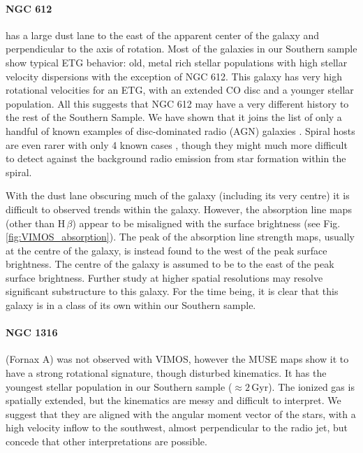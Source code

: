

\paragraph{NGC 612} has a large dust lane to the east of the apparent center of the galaxy and perpendicular to the axis of rotation. Most of the galaxies in our Southern sample show typical ETG behavior: old, metal rich stellar populations with high stellar velocity dispersions with the exception of NGC 612. This galaxy has very high rotational velocities for an ETG, with an extended CO disc and a younger stellar population. All this suggests that NGC 612 may have a very different history to the rest of the Southern Sample. We have shown that it joins the list of only a handful of known examples of disc-dominated radio (AGN) galaxies \citep[e.g.][]{Morganti2011}. Spiral hosts are even rarer with only 4 known cases \citep{Ledlow1998, Hota2011a, Bagchi2014, Mao2015}, though they might much more difficult to detect against the background radio emission from star formation within the spiral.

With the dust lane obscuring much of the galaxy (including its very centre) it is difficult to observed trends within the galaxy. However, the absorption line maps (other than H\,$\beta$) appear to be misaligned with the surface brightness (see Fig.\,\ref{fig:VIMOS_absorption}). The peak of the absorption line strength maps, usually at the centre of the galaxy, is instead found to the west of the peak surface brightness. The centre of the galaxy is assumed to be to the east of the peak surface brightness. Further study at higher spatial resolutions may resolve significant substructure to this galaxy. For the time being, it is clear that this galaxy is in a class of its own within our Southern sample. 


\paragraph{NGC 1316} (Fornax A) was not observed with VIMOS, however the MUSE maps show it to have a strong rotational signature, though disturbed kinematics. It has the youngest stellar population in our Southern sample ($\approx 2$\,Gyr). The ionized gas is spatially extended, but the kinematics are messy and difficult to interpret. We suggest that they are aligned with the angular moment vector of the stars, with a high velocity inflow to the southwest, almost perpendicular to the radio jet, but concede that other interpretations are possible. 

